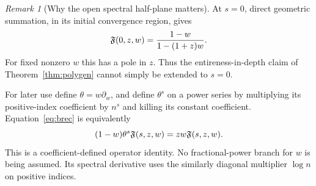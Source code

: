 \documentclass[11pt]{article}
\numberwithin{equation}{section}
\theoremstyle{definition}\newtheorem{definition}[theorem]{Definition}
\theoremstyle{remark}\newtheorem{remark}[theorem]{Remark}
\begin{document}
\begin{remark}[Why the open spectral half-plane matters]
At $s=0$, direct geometric summation, in its initial convergence region,
gives
\begin{equation}
 \mathfrak F(0,z,w)=\frac{1-w}{1-(1+z)w}.
 \label{eq:s0boundary}
\end{equation}
For fixed nonzero $w$ this has a pole in $z$. Thus the entireness-in-depth
claim of Theorem~\ref{thm:polygen} cannot simply be extended to $s=0$.
\end{remark}

For later use define $\theta=w\partial_w$, and define $\theta^s$ on a power
series by multiplying its positive-index coefficient by $n^s$ and killing
its constant coefficient. Equation~\eqref{eq:brec} is equivalently
\begin{equation}
 (1-w)\theta^s\mathfrak F(s,z,w)=zw\mathfrak F(s,z,w).
 \label{eq:theta}
\end{equation}
This is a coefficient-defined operator identity. No fractional-power
branch for $w$ is being assumed. Its spectral derivative uses the similarly
diagonal multiplier $\log n$ on positive indices.
\end{document}
